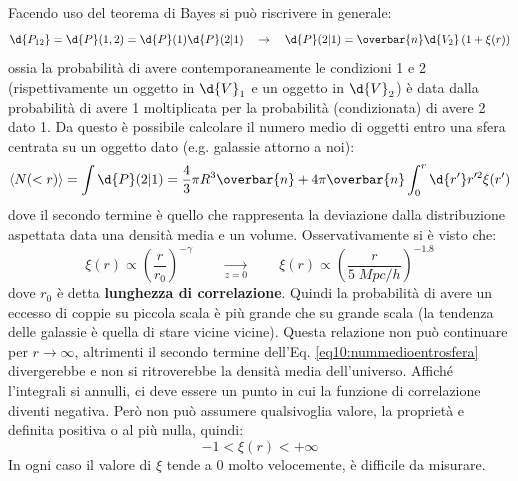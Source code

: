 Facendo uso del teorema di Bayes si può riscrivere in generale:
\begin{equation}
    \d{P_{12}}= \d{P}(1,2) = \d{P}(1) \d{P}(2|1)\quad \rightarrow \quad \d{P}(2|1)=\overbar{n}\d{V_2}\left(1+\xi(r)\right)
\end{equation}
ossia la probabilità di avere contemporaneamente le condizioni 1 e 2 (rispettivamente un oggetto in $\d{V}_1$ e un oggetto in $\d{V}_2$) è data dalla probabilità di avere 1 moltiplicata per la probabilità (condizionata) di avere 2 dato 1. Da questo è possibile calcolare il numero medio di oggetti entro una sfera centrata su un oggetto dato (e.g. galassie attorno a noi):
\begin{equation}
    \langle N(<r) \rangle =\int \d{P}(2|1) = \frac{4}{3}\pi R^3 \overbar{n} + 4\pi \overbar{n} \int_0^r \d{r'}r'^2 \xi (r') \label{eq10:nummedioentrosfera}
\end{equation}
dove il secondo termine è quello che rappresenta la deviazione dalla distribuzione aspettata data una densità media e un volume. Osservativamente si è visto che:
$$
\xi(r)\propto \left(\frac{r}{r_0}\right)^{-\gamma} \qquad \xrightarrow[z=0]{} \qquad \xi(r)\propto \left(\frac{r}{5\; Mpc/h}\right)^{-1.8}
$$
dove $r_0$ è detta \textbf{lunghezza di correlazione}. Quindi la probabilità di avere un eccesso di coppie su piccola scala è più grande che su grande scala (la tendenza delle galassie è quella di stare vicine vicine). Questa relazione non può continuare per $r\to \infty$, altrimenti il secondo termine dell'Eq. \ref{eq10:nummedioentrosfera} divergerebbe e non si ritroverebbe la densità media dell'universo. Affiché l'integrali si annulli, ci deve essere un punto in cui la funzione di correlazione diventi negativa. Però non può assumere qualsivoglia valore, la proprietà e definita positiva o al più nulla, quindi:
$$
-1 < \xi(r) < +\infty
$$
In ogni caso il valore di $\xi$ tende a $0$ molto velocemente, è difficile da misurare.

